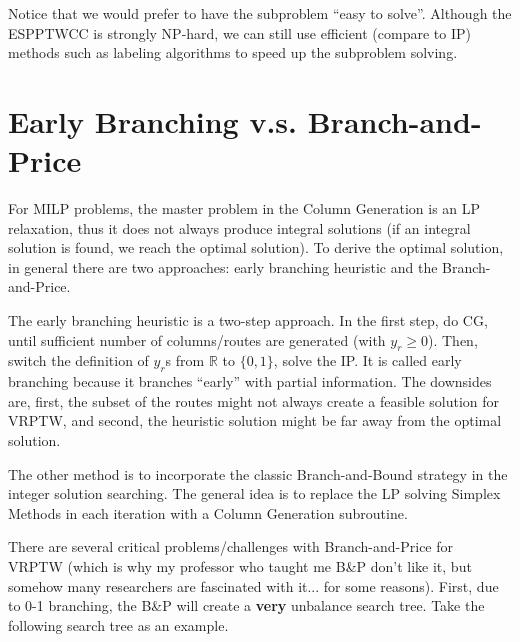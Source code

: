             Notice that we would prefer to have the subproblem ``easy to solve''. Although the ESPPTWCC is strongly NP-hard, we can still use efficient (compare to IP) methods such as labeling algorithms to speed up the subproblem solving.

    \section{Early Branching v.s. Branch-and-Price}
        For MILP problems, the master problem in the Column Generation is an LP relaxation, thus it does not always produce integral solutions (if an integral solution is found, we reach the optimal solution). To derive the optimal solution, in general there are two approaches: early branching heuristic and the Branch-and-Price.

        The early branching heuristic is a two-step approach. In the first step, do CG, until sufficient number of columns/routes are generated (with $y_r \ge 0$). Then, switch the definition of $y_r$s from $\mathbb{R}$ to $\{0, 1\}$, solve the IP. It is called early branching because it branches ``early'' with partial information. The downsides are, first, the subset of the routes might not always create a feasible solution for VRPTW, and second, the heuristic solution might be far away from the optimal solution.

        The other method is to incorporate the classic Branch-and-Bound strategy in the integer solution searching. The general idea is to replace the LP solving Simplex Methods in each iteration with a Column Generation subroutine.

        There are several critical problems/challenges with Branch-and-Price for VRPTW (which is why my professor who taught me B\&P don't like it, but somehow many researchers are fascinated with it... for some reasons). First, due to 0-1 branching, the B\&P will create a \textbf{very} unbalance search tree. Take the following search tree as an example.

        \begin{figure}[h!]
            \centering
        \end{figure}

